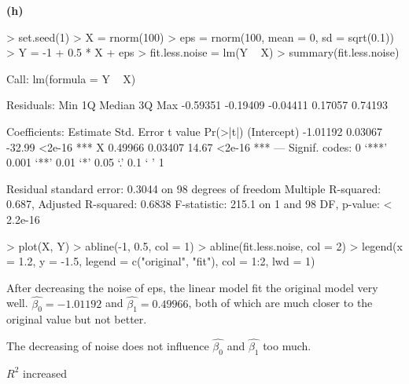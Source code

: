 \documentclass[a4paper]{article}
\renewcommand{\part}[1] {\vspace{.10in} {\bf (#1)}}
\begin{document}
\part{h}
\begin{Schunk}
\begin{Sinput}
> set.seed(1)
> X = rnorm(100)
> eps = rnorm(100, mean = 0, sd = sqrt(0.1))
> Y = -1 + 0.5 * X + eps
> fit.less.noise = lm(Y ~ X)
> summary(fit.less.noise)
\end{Sinput}
\begin{Soutput}
Call:
lm(formula = Y ~ X)

Residuals:
     Min       1Q   Median       3Q      Max 
-0.59351 -0.19409 -0.04411  0.17057  0.74193 

Coefficients:
            Estimate Std. Error t value Pr(>|t|)    
(Intercept) -1.01192    0.03067  -32.99   <2e-16 ***
X            0.49966    0.03407   14.67   <2e-16 ***
---
Signif. codes:  0 ‘***’ 0.001 ‘**’ 0.01 ‘*’ 0.05 ‘.’ 0.1 ‘ ’ 1

Residual standard error: 0.3044 on 98 degrees of freedom
Multiple R-squared:  0.687,	Adjusted R-squared:  0.6838 
F-statistic: 215.1 on 1 and 98 DF,  p-value: < 2.2e-16
\end{Soutput}
\begin{Sinput}
> plot(X, Y)
> abline(-1, 0.5, col = 1)
> abline(fit.less.noise, col = 2)
> legend(x = 1.2, y = -1.5, legend = c("original", "fit"), col = 1:2, lwd = 1)
\end{Sinput}
\end{Schunk}
\begin{enumerate}
{\color{red}
\item After decreasing the noise of eps, the linear model fit the original model very well. $\hat{\beta_0} = -1.01192$ and $\hat{\beta_1} = 0.49966$, both of which are much closer to the original value but not better.
\item The decreasing of noise does not influence $\hat{\beta_0}$ and $\hat{\beta_1}$ too much.
\item $R^2$ increased
}
\end{enumerate}
\end{document}

